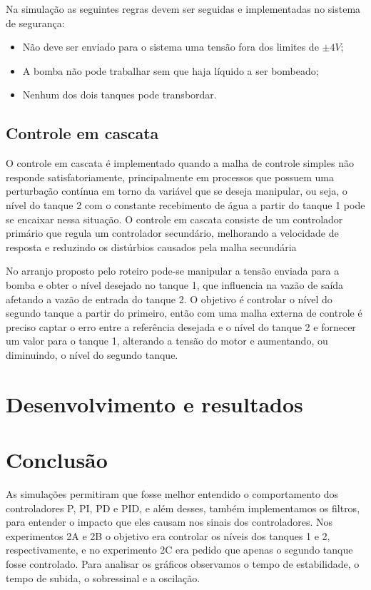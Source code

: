 \documentclass[
	12pt,				%
	openany,			%
	oneside,			%
	a4paper,			%
	english,			%
	french,				%
	spanish,			%
	brazil,				%
	]{abntex2}
\begin{document}
{Na simulação as seguintes regras devem ser seguidas e implementadas no sistema de segurança:

\begin{itemize}
	\item Não deve ser enviado para o sistema uma tensão fora dos limites de $\pm 4V$;
	\item A bomba não pode trabalhar sem que haja líquido a ser bombeado;
	\item Nenhum dos dois tanques pode transbordar.
\end{itemize}

\section{Controle em cascata}

O controle em cascata é implementado quando a malha de controle simples não responde satisfatoriamente, principalmente em processos que possuem uma perturbação contínua em torno da variável que se deseja manipular, ou seja, o nível do tanque 2 com o constante recebimento de água a partir do tanque 1 pode se encaixar nessa situação. O controle em cascata consiste de um controlador primário que regula um controlador secundário, melhorando a velocidade de resposta e reduzindo os distúrbios causados pela malha secundária

No arranjo proposto pelo roteiro pode-se manipular a tensão enviada para a bomba e obter o nível desejado no tanque 1, que influencia na vazão de saída afetando a vazão de entrada do tanque 2. O objetivo é controlar o nível do segundo tanque a partir do primeiro, então com uma malha externa de controle é preciso captar o erro entre a referência desejada e o nível do tanque 2 e fornecer um valor para o tanque 1, alterando a tensão do motor e aumentando, ou diminuindo, o nível do segundo tanque.
\chapter{Desenvolvimento e resultados}



\chapter{Conclusão}

As simulações permitiram que fosse melhor entendido o comportamento dos controladores P, PI, PD e PID, e além desses, também implementamos os filtros, para entender o impacto que eles causam nos sinais dos controladores. Nos experimentos 2A e 2B o objetivo era controlar os níveis dos tanques 1 e 2, respectivamente, e no experimento 2C era pedido que apenas o segundo tanque fosse controlado. Para analisar os gráficos observamos o tempo de estabilidade, o tempo de subida, o sobressinal e a oscilação.

}
\end{document}
